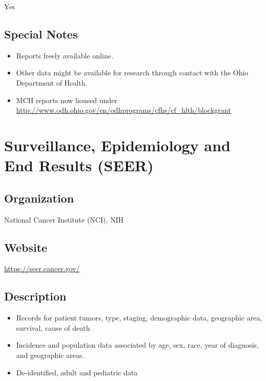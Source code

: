 \documentclass[
]{book}
\providecommand{\tightlist}{%
  \setlength{\itemsep}{0pt}\setlength{\parskip}{0pt}}
\begin{document}
Yes

\hypertarget{special-notes-86}{%
\section{Special Notes}\label{special-notes-86}}

\begin{itemize}
\tightlist
\item
  Reports freely available online.
\item
  Other data might be available for research through contact with the Ohio Department of Health.
\item
  MCH reports now housed under \url{http://www.odh.ohio.gov/en/odhprograms/cfhs/cf_hlth/blockgrant}
\end{itemize}

\mainmatter

\hypertarget{surveillance-epidemiology-and-end-results-seer}{%
\chapter{Surveillance, Epidemiology and End Results (SEER)}\label{surveillance-epidemiology-and-end-results-seer}}

\hypertarget{organization-87}{%
\section{Organization}\label{organization-87}}

National Cancer Institute (NCI), NIH

\hypertarget{website-87}{%
\section{Website}\label{website-87}}

\url{https://seer.cancer.gov/}

\hypertarget{description-87}{%
\section{Description}\label{description-87}}

\begin{itemize}
\tightlist
\item
  Records for patient tumors, type, staging, demographic data, geographic area, survival, cause of death
\item
  Incidence and population data associated by age, sex, race, year of diagnosis, and geographic areas.
\item
  De-identified, adult and pediatric data
\end{itemize}
\end{document}
